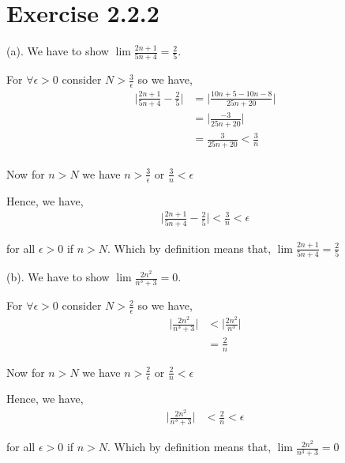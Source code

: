 \documentclass[a4paper]{report}
\begin{document}
\section*{Exercise 2.2.2}

(a). We have  to show $\lim \frac{2n + 1}{5n + 4} = \frac{2}{5}$. 

\vspace{1em}

For $\forall \epsilon > 0$ consider $N > \frac{3}{\epsilon}$ so we have, 
\begin{align*}
    \bigg | \frac{2n + 1}{5n + 4} - \frac{2}{5} \bigg | &= \bigg | \frac{10n + 5 - 10n - 8 }{25n + 20}\bigg |\\
&= \bigg | \frac{ -3 }{25n + 20}\bigg |\\
&= \frac{ 3 }{25n + 20} < \frac{3}{n} \\
\end{align*}


Now for $n > N$ we have $n > \frac{3}{\epsilon}$  or $\frac{3}{n}< \epsilon$ 

Hence, we have, 
\begin{align*}
    \bigg | \frac{2n + 1}{5n + 4} - \frac{2}{5} \bigg | < \frac{3}{n} < \epsilon
\end{align*}

for all $\epsilon > 0$ if $n > N$. Which by definition means that, $\lim \frac{2n + 1}{5n + 4} = \frac{2}{5}$


\vspace{1em}

(b). We have  to show $\lim \frac{2n^2}{n^{3} + 3} = 0$. 

\vspace{1em}

For $\forall \epsilon > 0$ consider $N > \frac{2}{\epsilon}$ so we have, 
\begin{align*}
    \bigg | \frac{2n^2}{n^{3} + 3} \bigg | &< \bigg | \frac{2n^2}{n^{3}} \bigg |\\
                                           &=  \frac{2}{n}
\end{align*}

Now for $n > N$ we have $n > \frac{2}{\epsilon}$  or $\frac{2}{n}< \epsilon$ 

Hence, we have, 
\begin{align*}
    \bigg | \frac{2n^2}{n^{3} + 3} \bigg | &< \frac{2}{n} < \epsilon
\end{align*}

for all $\epsilon > 0$ if $n > N$. Which by definition means that, $\lim \frac{2n^2}{n^{3} + 3} = 0$
\end{document}
